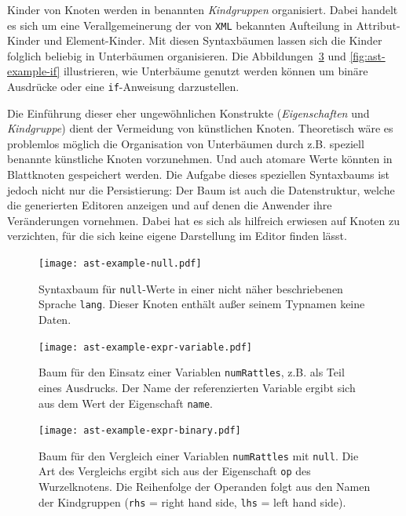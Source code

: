 \documentclass[paper=a4,fontsize=11pt,parskip=half]{scrartcl}
\begin{document}
Kinder von Knoten werden in benannten \textit{Kindgruppen} organisiert. Dabei handelt es sich um eine Verallgemeinerung der von \texttt{XML} bekannten Aufteilung in Attribut-Kinder und Element-Kinder. Mit diesen Syntaxbäumen lassen sich die Kinder folglich beliebig in Unterbäumen organisieren. Die Abbildungen~\ref{fig:ast-example-binary} und \ref{fig:ast-example-if} illustrieren, wie Unterbäume genutzt werden können um binäre Ausdrücke oder eine \texttt{if}-Anweisung darzustellen.

Die Einführung dieser eher ungewöhnlichen Konstrukte (\textit{Eigenschaften} und \textit{Kindgruppe}) dient der Vermeidung von künstlichen Knoten. Theoretisch wäre es problemlos möglich die Organisation von Unterbäumen durch z.B. speziell benannte künstliche Knoten vorzunehmen. Und auch atomare Werte könnten in Blattknoten gespeichert werden. Die Aufgabe dieses speziellen Syntaxbaums ist jedoch nicht nur die Persistierung: Der Baum ist auch die Datenstruktur, welche die generierten Editoren anzeigen und auf denen die Anwender ihre Veränderungen vornehmen. Dabei hat es sich als hilfreich erwiesen auf Knoten zu verzichten, für die sich keine eigene Darstellung im Editor finden lässt.

\begin{figure}[p]
  \centering\texttt{[image: ast-example-null.pdf]}
  \caption{Syntaxbaum für \texttt{null}-Werte in einer nicht näher beschriebenen Sprache \texttt{lang}. Dieser Knoten enthält außer seinem Typnamen keine Daten.}
  \label{fig:ast-example-null}
\end{figure}

\begin{figure}[p]
  \centering\texttt{[image: ast-example-expr-variable.pdf]}
  \caption{Baum für den Einsatz einer Variablen \texttt{numRattles}, z.B. als Teil eines Ausdrucks. Der Name der referenzierten Variable ergibt sich aus dem Wert der Eigenschaft \texttt{name}.}
  \label{fig:ast-example-variable}
\end{figure}

\begin{figure}[p]
  \centering\texttt{[image: ast-example-expr-binary.pdf]}
  \caption{Baum für den Vergleich einer Variablen \texttt{numRattles} mit \texttt{null}. Die Art des Vergleichs ergibt sich aus der Eigenschaft \texttt{op} des Wurzelknotens. Die Reihenfolge der Operanden folgt aus den Namen der Kindgruppen (\texttt{rhs} = right hand side, \texttt{lhs} = left hand side).}
  \label{fig:ast-example-binary}
\end{figure}
\end{document}
